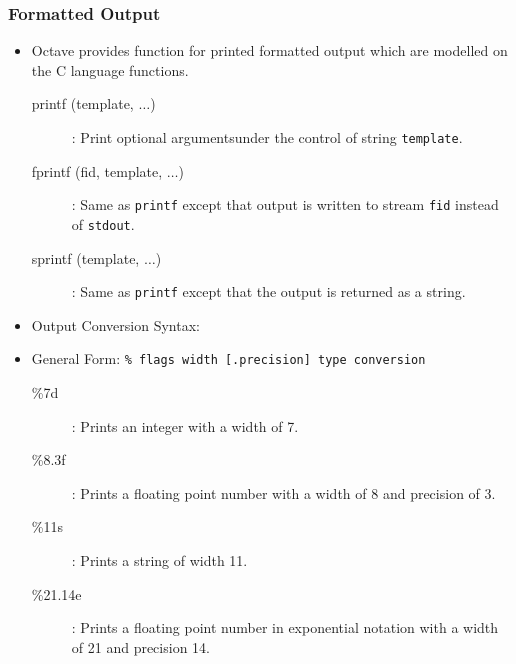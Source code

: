 \documentclass[t,compress,xcolor=svgnames]{beamer}
\begin{document}
\begin{frame}[fragile]
  \frametitle{\small Formatted Output}
  \begin{itemize}
    \item Octave provides function for printed formatted output which are modelled on the C language functions.
    \begin{description}
      \item[printf (template, $\dots$)]: Print optional argumentsunder the control of string \texttt{template}.
      \item[fprintf (fid, template, $\dots$)]: Same as \texttt{printf} except that output is written to stream \texttt{fid} instead of \texttt{stdout}.
      \item[sprintf (template, $\dots$)]: Same as \texttt{printf} except that the output is returned as a string.
    \end{description}
    \item Output Conversion Syntax:
    \item[] General Form: \texttt{\% flags width [.precision] type conversion}
    \begin{description}
      \item[\%7d]: Prints an integer with a width of 7.
      \item[\%8.3f]: Prints a floating point number with a width of 8 and precision of 3.
      \item[\%11s]: Prints a string of width 11.
      \item[\%21.14e]: Prints a floating point number in exponential notation with a width of 21 and precision 14.
    \end{description}
  \end{itemize}
\end{frame}
\end{document}
